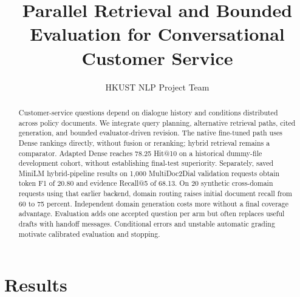 \documentclass[11pt]{article}
\title{Parallel Retrieval and Bounded Evaluation for Conversational Customer Service}
\author{HKUST NLP Project Team}
\begin{document}
\maketitle
\begin{abstract}
Customer-service questions depend on dialogue history and conditions distributed across policy documents. We integrate query planning, alternative retrieval paths, cited generation, and bounded evaluator-driven revision. The native fine-tuned path uses Dense rankings directly, without fusion or reranking; hybrid retrieval remains a comparator. Adapted Dense reaches 78.25 Hit@10 on a historical dummy-file development cohort, without establishing final-test superiority. Separately, saved MiniLM hybrid-pipeline results on 1,000 MultiDoc2Dial validation requests obtain token F1 of 20.80 and evidence Recall@5 of 68.13. On 20 synthetic cross-domain requests using that earlier backend, domain routing raises initial document recall from 60 to 75 percent. Independent domain generation costs more without a final coverage advantage. Evaluation adds one accepted question per arm but often replaces useful drafts with handoff messages. Conditional errors and unstable automatic grading motivate calibrated evaluation and stopping.
\end{abstract}




\section{Results}
\label{sec:results}





\end{document}
